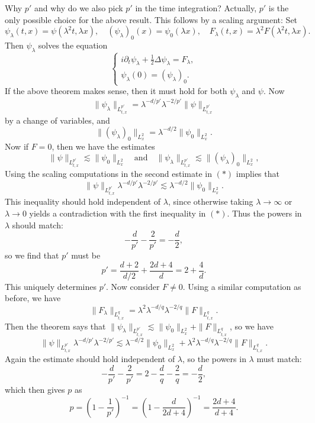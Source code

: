 \begin{remark}
  Why $p'$ and why do we also pick $p'$ in the time
  integration? Actually, $p'$ is the only possible
  choice for the above result. This follows by a
  scaling argument: Set
  \[
    \psi_\lambda(t, x) = \psi(\lambda^2 t, \lambda x),
    \quad
    (\psi_\lambda)_0(x) = \psi_0(\lambda x),
    \quad
    F_\lambda(t, x) = \lambda^2 F(\lambda^2 t, \lambda x).
  \]
  Then $\psi_\lambda$ solves the equation
  \[
    \begin{cases}
    i \partial_t \psi_\lambda + \frac{1}{2} \Delta \psi_\lambda = F_\lambda, \\
    \psi_\lambda(0) = (\psi_{\lambda})_0.
    \end{cases}
  \]
  If the above theorem makes sense, then it must hold
  for both $\psi_\lambda$ and $\psi$. Now
  \[
    \|\psi_\lambda\|_{L^{p'}_{t, x}}
    = \lambda^{-d / p'} \lambda^{-2 / p'} \|\psi\|_{L^{p'}_{t, x}}
  \]
  by a change of variables, and
  \[
    \|(\psi_\lambda)_0\|_{L^2_x}
    = \lambda^{-d / 2} \|\psi_0\|_{L^2_x}.
  \]
  Now if $F = 0$, then we have the estimates
  \[
    \|\psi\|_{L^{p'}_{t, x}} \lesssim \|\psi_0\|_{L^2_x}
    \quad \text{and} \quad
    \|\psi_\lambda\|_{L^{p'}_{t, x}}
    \lesssim \|(\psi_\lambda)_0\|_{L^2_x}, \tag{$*$}
  \]
  Using the scaling computations in the second estimate
  in $(*)$ implies that
  \[
    \| \psi \|_{L^{p'}_{t, x}} \lambda^{-d / p'} \lambda^{-2 / p'}
    \lesssim \lambda^{-d / 2} \|\psi_0\|_{L^2_x}.
  \]
  This inequality should hold independent of $\lambda$,
  since otherwise taking $\lambda \to \infty$ or
  $\lambda \to 0$ yields a contradiction with the
  first inequality in $(*)$.
  Thus the powers in $\lambda$ should match:
  \[
    -\frac{d}{p'} - \frac{2}{p'} = -\frac{d}{2},
  \]
  so we find that $p'$ must be
  \[
    p' = \frac{d + 2}{d / 2} + \frac{2d + 4}{d} = 2 + \frac{4}{d}.
  \]
  This uniquely determines $p'$. Now consider $F \ne 0$.
  Using a similar computation as before, we have
  \[
    \|F_\lambda\|_{L^q_{t, x}} = \lambda^2 \lambda^{-d / q} \lambda^{-2 / q} \|F\|_{L^q_{t, x}}.
  \]
  Then the theorem says that
  $\|\psi_\lambda\|_{L^{p'}_{t, x}} \lesssim \|\psi_0\|_{L^2_x} + \|F\|_{L^q_{t, x}}$,
  so we have
  \[
    \|\psi\|_{L^{p'}_{t, x}} \lambda^{-d / p'} \lambda^{-2 / p'}
    \lesssim \lambda^{-d / 2} \| \psi_0 \|_{L^2_x} + \lambda^2 \lambda^{-d / q} \lambda^{-2 / q} \|F\|_{L^q_{t, x}}.
  \]
  Again the estimate should hold independent of
  $\lambda$, so the powers in $\lambda$ must match:
  \[
    -\frac{d}{p'} - \frac{2}{p'} = 2 - \frac{d}{q} - \frac{2}{q} = -\frac{d}{2},
  \]
  which then gives $p$ as
  \[
    p = \left(1 - \frac{1}{p'}\right)^{-1} = \left(1 - \frac{d}{2d + 4}\right)^{-1} = \frac{2d + 4}{d + 4}.
  \]
\end{remark}

